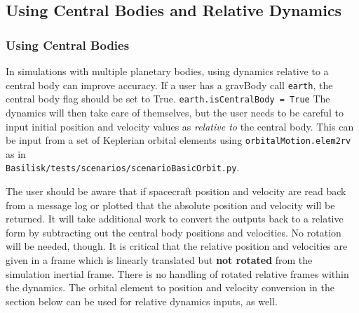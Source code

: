 \subsection{Using Central Bodies and Relative Dynamics}
\subsubsection{Using Central Bodies}
In simulations with multiple planetary bodies, using dynamics relative to a central body can improve accuracy. If a user has a gravBody call \verb|earth|, the central body flag should be set to True.
\verb|earth.isCentralBody = True|	
The dynamics will then take care of themselves, but the user needs to be careful to input initial position and velocity values as \textit{relative to} the central body. This can be input from a set of Keplerian orbital elements using \verb|orbitalMotion.elem2rv| as in\\ \verb|Basilisk/tests/scenarios/scenarioBasicOrbit.py|. 

The user should be aware that if spacecraft position and velocity are read back from a message log or plotted that the absolute position and velocity will be returned. It will take additional work to convert the outputs back to a relative form by subtracting out the central body positions and velocities. No rotation will be needed, though.
It is critical that the relative position and velocities are given in a frame which is linearly translated but \textbf{not rotated} from the simulation inertial frame. There is no handling of rotated relative frames within the dynamics. The orbital element to position and velocity conversion in the section below can be used for relative dynamics inputs, as well.

